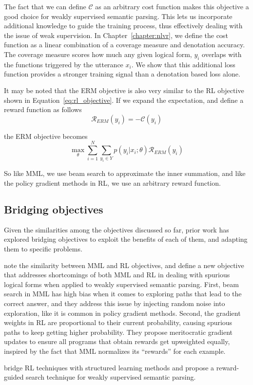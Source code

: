 The fact that we can define $\mathcal{C}$ as an arbitrary cost function makes
this objective a good choice for weakly supervised semantic parsing. This lets
us incorporate additional knowledge to guide the training process,
thus effectively dealing with the issue of weak supervision. In
Chapter~\ref{chapter:nlvr}, we define the cost function as a linear combination
of a coverage measure and denotation accuracy. The coverage measure scores how
much any given logical form, $y_i$ overlaps with the functions triggered by the
utterance $x_i$. We show that this additional loss function provides a 
stronger training signal than a denotation based loss alone.

It may be noted that the ERM objective is also very similar to the RL objective
shown in Equation~\ref{eq:rl_objective}. If we expand the expectation, and 
define a reward function as follows
\begin{equation}
	\mathcal{R}_{ERM}(y_i) = -\mathcal{C}(y_i)
\end{equation}

\noindent the ERM objective becomes
\begin{equation}
	\max_{\theta} \sum_{i=1}^{N} \sum_{y_i \in Y} p(y_i|x_i;\theta)
	\mathcal{R}_{ERM}(y_i) \label{eq:erm_objective2}	
\end{equation}

\noindent So like MML, we use beam search to approximate the inner summation,
and like the policy gradient methods in RL, we use an arbitrary reward function.

\subsection{Bridging objectives}
Given the similarities among the objectives discussed so far, prior work has
explored bridging objectives to exploit the benefits of each
of them, and adapting them to specific problems.

\cite{guu2017bridging} note the
similarity between MML and RL objectives, and define a new objective that
addresses shortcomings of both MML and RL in dealing with spurious logical forms
when applied to weakly supervised semantic parsing. First, beam search in MML
has high bias when it comes to exploring paths that
lead to the correct answer, and they address this issue by injecting random
noise into exploration, like it is common in policy gradient methods. Second,
the gradient weights in RL are proportional to their current probability,
causing spurious paths to keep getting higher probability. They propose
meritocratic gradient updates to ensure all programs that obtain rewards get
upweighted equally, inspired by the fact that MML normalizes its
``rewards'' for each example.

\cite{IyyerSQA2016} bridge RL techniques with structured learning methods and
propose a reward-guided search technique for weakly supervised semantic parsing.

